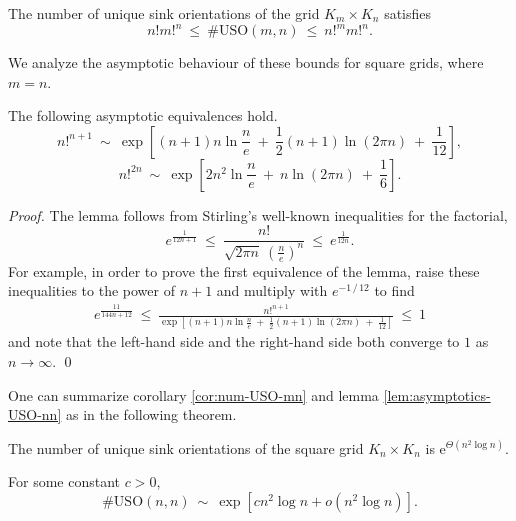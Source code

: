 \documentclass[runningheads,a4paper]{llncs}
\newcommand{\USO}{\ensuremath{\mathrm{USO}}}
\newcommand{\e}{\ensuremath{\mathrm{e}}}
\begin{document}
\begin{corollary}
    \label{cor:num-USO-mn}
    The number of unique sink orientations of the grid
    $K_m \times K_n$ satisfies
    \[
        n! m!^n ~\le~ \#\USO(m,n) ~\le~ n!^m m!^n.
    \]
\end{corollary}

\noindent
We analyze the asymptotic behaviour of these bounds for square grids, where
$m=n$.

\begin{lemma}
    \label{lem:asymptotics-USO-nn}
    The following asymptotic equivalences hold.
    \[
        n!^{n+1} ~\sim~
            \exp \left[
                (n+1) n \ln \frac{n}{e} ~+~ \frac{1}{2} (n+1) \ln (2 \pi n) ~+~ \frac{1}{12}
            \right],
    \]
    \[
        n!^{2n} ~\sim~
        \exp \left[
            2n^2 \ln \frac{n}{e} ~+~ n \ln (2 \pi n) ~+~ \frac{1}{6}
        \right].
    \]
\end{lemma}

\begin{proof}
    The lemma follows from Stirling's well-known inequalities for the factorial,
    \[
        e ^ \frac{1}{12n+1}
        ~\le~
        \frac{ n! }{ \sqrt{2 \pi n} ~ \left( \frac{n}{e} \right) ^ n }
        ~\le~
        e ^ \frac{1}{12n} .
    \]
    For example, in order to prove the first equivalence of the lemma, raise
    these inequalities to the power of $n+1$ and multiply with
    $e ^ { -1\,/\,12 }$ to find
    \begin{align*}
        e ^ \frac{11}{144n+12}
        ~\le~
        \frac{ n!^{n+1} }{ \exp \left[
                                    (n+1) n \ln \frac{n}{e} ~+~
                                    \frac{1}{2} (n+1) \ln (2 \pi n)
                                    ~+~ \frac{1}{12} \right] }
        ~\le~
        1
    \end{align*}
    and note that the left-hand side and the right-hand side both converge to $1$
    as $n \to \infty$. \qed
\end{proof}

One can summarize corollary \ref{cor:num-USO-mn} and lemma
\ref{lem:asymptotics-USO-nn} as in the following theorem.

\begin{theorem}
    \label{thm:asymptotics-USO-nn}
    The number of unique sink orientations of the square grid $K_n \times K_n$
    is $\e ^ { \Theta(n^2 \log n) }$.
\end{theorem}

\begin{conjecture}
    For some constant $c > 0$,
    \[
        \#\USO(n,n) ~\sim~ \exp\left[ c n^2 \log n + o(n^2 \log n) \right].
    \]
\end{conjecture}
\end{document}
